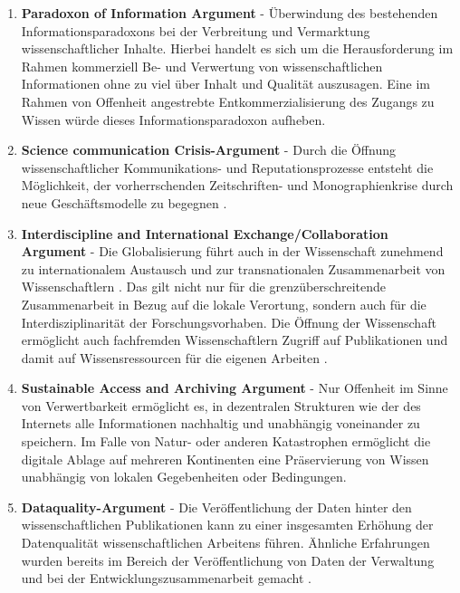 \begin{enumerate}
\item \textbf{Paradoxon of Information Argument} - Überwindung des bestehenden Informationsparadoxons bei der Verbreitung und Vermarktung wissenschaftlicher Inhalte. Hierbei handelt es sich um die Herausforderung im Rahmen kommerziell Be- und Verwertung von wissenschaftlichen Informationen ohne zu viel über Inhalt und Qualität auszusagen. Eine im Rahmen von Offenheit angestrebte Entkommerzialisierung des Zugangs zu Wissen würde dieses Informationsparadoxon aufheben.
\item \textbf{Science communication Crisis-Argument} - Durch die Öffnung wissenschaftlicher Kommunikations- und Reputationsprozesse entsteht die Möglichkeit, der vorherrschenden Zeitschriften- und Monographienkrise durch neue Geschäftsmodelle zu begegnen \cite{muller_2010_open}.
\item \textbf{Interdiscipline and International Exchange/Collaboration Argument} - Die Globalisierung führt auch in der Wissenschaft zunehmend zu internationalem Austausch und zur transnationalen Zusammenarbeit von Wissenschaftlern \cite{Waltman_2011}. Das gilt nicht nur für die grenzüberschreitende Zusammenarbeit in Bezug auf die lokale Verortung, sondern auch für die Interdisziplinarität der Forschungsvorhaben. Die Öffnung der Wissenschaft ermöglicht auch fachfremden Wissenschaftlern Zugriff auf Publikationen und damit auf Wissensressourcen für die eigenen Arbeiten \cite{suchen}.
\item \textbf{Sustainable Access and Archiving Argument} - Nur Offenheit im Sinne von Verwertbarkeit ermöglicht es, in dezentralen Strukturen wie der des Internets alle Informationen nachhaltig und unabhängig voneinander zu speichern. Im Falle von Natur- oder anderen Katastrophen ermöglicht die digitale Ablage auf mehreren Kontinenten eine Präservierung von Wissen unabhängig von lokalen Gegebenheiten oder Bedingungen.
\item \textbf{Dataquality-Argument} - Die Veröffentlichung der Daten hinter den wissenschaftlichen Publikationen kann zu einer insgesamten Erhöhung der Datenqualität wissenschaftlichen Arbeitens führen. Ähnliche Erfahrungen wurden bereits im Bereich der Veröffentlichung von Daten der Verwaltung und bei der Entwicklungszusammenarbeit gemacht \cite{heise_2014_bundestag}.
\end{enumerate}

